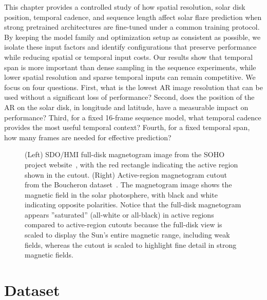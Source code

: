 This chapter provides a controlled study of how spatial resolution, solar disk position, temporal cadence, and sequence length affect solar flare prediction when strong pretrained architectures are fine-tuned under a common training protocol. By keeping the model family and optimization setup as consistent as possible, we isolate these input factors and identify configurations that preserve performance while reducing spatial or temporal input costs. Our results show that temporal span is more important than dense sampling in the sequence experiments, while lower spatial resolution and sparse temporal inputs can remain competitive. We focus on four questions. First, what is the lowest AR image resolution that can be used without a significant loss of performance? Second, does the position of the AR on the solar disk, in longitude and latitude, have a measurable impact on performance? Third, for a fixed 16-frame sequence model, what temporal cadence provides the most useful temporal context? Fourth, for a fixed temporal span, how many frames are needed for effective prediction?

\begin{figure}[H]
\centering
\begin{minipage}{0.47\textwidth}
\centering
{}
\end{minipage}
\hfill
\begin{minipage}{0.47\textwidth}
\centering
{}
\end{minipage}
\caption{(Left) SDO/HMI full-disk magnetogram image from the SOHO project website~\cite{ref_soho}, with the red rectangle indicating the active region shown in the cutout. (Right) Active-region magnetogram cutout from the Boucheron dataset~\cite{ref_boucheron}. The magnetogram image shows the magnetic field in the solar photosphere, with black and white indicating opposite polarities. Notice that the full-disk magnetogram appears ''saturated'' (all-white or all-black) in active regions compared to active-region cutouts because the full-disk view is scaled to display the Sun's entire magnetic range, including weak fields, whereas the cutout is scaled to highlight fine detail in strong magnetic fields.}
\label{fig:article_intro_magnetogram}
\end{figure}


\section{Dataset}

